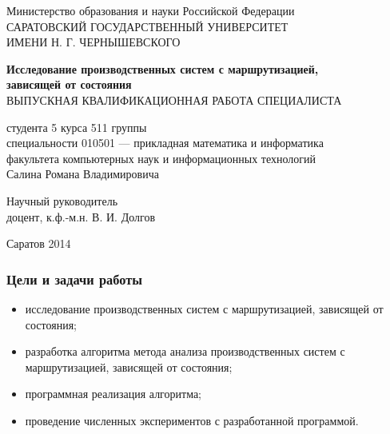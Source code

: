 
\begin{frame}[plain]
\begin{center}
Министерство образования и науки Российской Федерации\\
САРАТОВСКИЙ ГОСУДАРСТВЕННЫЙ УНИВЕРСИТЕТ\\
ИМЕНИ Н. Г. ЧЕРНЫШЕВСКОГО
\end{center}


\vfill

\begin{center}
\textbf{Исследование производственных систем с маршрутизацией,\\зависящей от состояния}\\
\medskip
ВЫПУСКНАЯ КВАЛИФИКАЦИОННАЯ РАБОТА СПЕЦИАЛИСТА
\end{center}
\begin{flushleft}
студента 5 курса 511 группы\\
специальности 010501 --- прикладная математика и информатика\\
факультета компьютерных наук и информационных технологий\\
Салина Романа Владимировича
\end{flushleft}

\vfill

\noindent
\begin{flushleft}
Научный руководитель\\
доцент, к.ф.-м.н. \hfill В. И. Долгов\\
\end{flushleft}

\vfill

\begin{center}
Саратов 2014
\end{center}
\end{frame}


\begin{frame} \frametitle{Цели и задачи работы}
\begin{itemize}
\item исследование производственных систем с маршрутизацией, зависящей от состояния;
\item разработка алгоритма метода анализа производственных систем с маршрутизацией, зависящей от состояния;
\item программная реализация алгоритма;
\item проведение численных экспериментов с разработанной программой.
\end{itemize}
\end{frame}

